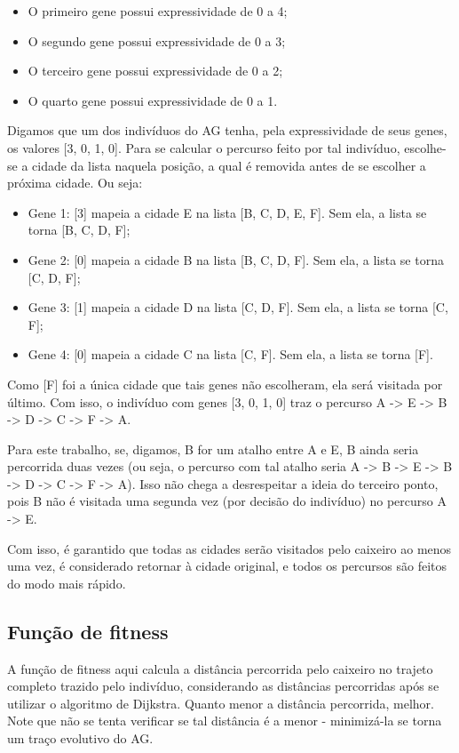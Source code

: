 \begin{itemize}
	\item O primeiro gene possui expressividade de 0 a 4;
	\item O segundo gene possui expressividade de 0 a 3;
	\item O terceiro gene possui expressividade de 0 a 2;
	\item O quarto gene possui expressividade de 0 a 1.
\end{itemize}

Digamos que um dos indivíduos do AG tenha, pela expressividade de seus genes, os valores [3, 0, 1, 0]. Para se calcular o percurso feito por tal indivíduo, escolhe-se a cidade da lista naquela posição, a qual é removida antes de se escolher a próxima cidade. Ou seja:

\begin{itemize}
	\item Gene 1: [3] mapeia a cidade E na lista [B, C, D, E, F]. Sem ela, a lista se torna [B, C, D, F];
	\item Gene 2: [0] mapeia a cidade B na lista [B, C, D, F]. Sem ela, a lista se torna [C, D, F];
	\item Gene 3: [1] mapeia a cidade D na lista [C, D, F]. Sem ela, a lista se torna [C, F];
	\item Gene 4: [0] mapeia a cidade C na lista [C, F]. Sem ela, a lista se torna [F].
\end{itemize}

Como [F] foi a única cidade que tais genes não escolheram, ela será visitada por último. Com isso, o indivíduo com genes [3, 0, 1, 0] traz o percurso A -> E -> B -> D -> C -> F -> A.

Para este trabalho, se, digamos, B for um atalho entre A e E, B ainda seria percorrida duas vezes (ou seja, o percurso com tal atalho seria A -> B -> E -> B -> D -> C -> F -> A). Isso não chega a desrespeitar a ideia do terceiro ponto, pois B não é visitada uma segunda vez (por decisão do indivíduo) no percurso A -> E.

Com isso, é garantido que todas as cidades serão visitados pelo caixeiro ao menos uma vez, é considerado retornar à cidade original, e todos os percursos são feitos do modo mais rápido.

\subsection*{Função de fitness}

A função de fitness aqui calcula a distância percorrida pelo caixeiro no trajeto completo trazido pelo indivíduo, considerando as distâncias percorridas após se utilizar o algoritmo de Dijkstra. Quanto menor a distância percorrida, melhor. Note que não se tenta verificar se tal distância é a menor - minimizá-la se torna um traço evolutivo do AG.
